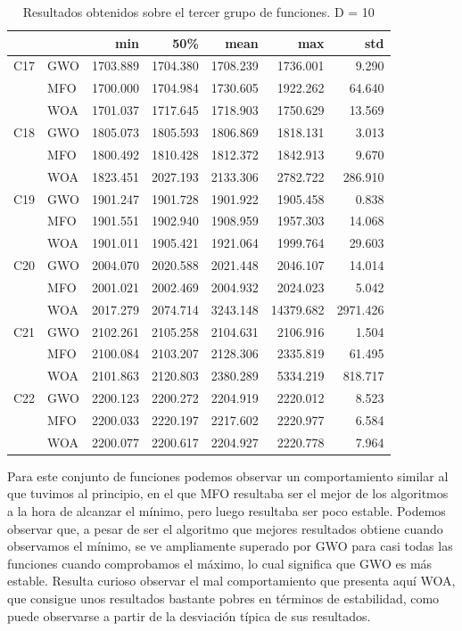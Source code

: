 \documentclass[
  a4paper,
,tablecaptionabove
]{scrartcl}
\begin{document}
\begin{longtable}{llrrrrr}
\caption{Resultados obtenidos sobre el tercer grupo de funciones. D = 10} \\
\toprule
    &     &      min &      50\% &     mean &       max &      std \\
\midrule
C17 & GWO & 1703.889 & 1704.380 & 1708.239 &  1736.001 &    9.290 \\
    & MFO & 1700.000 & 1704.984 & 1730.605 &  1922.262 &   64.640 \\
    & WOA & 1701.037 & 1717.645 & 1718.903 &  1750.629 &   13.569 \\
\midrule
C18 & GWO & 1805.073 & 1805.593 & 1806.869 &  1818.131 &    3.013 \\
    & MFO & 1800.492 & 1810.428 & 1812.372 &  1842.913 &    9.670 \\
    & WOA & 1823.451 & 2027.193 & 2133.306 &  2782.722 &  286.910 \\
\midrule
C19 & GWO & 1901.247 & 1901.728 & 1901.922 &  1905.458 &    0.838 \\
    & MFO & 1901.551 & 1902.940 & 1908.959 &  1957.303 &   14.068 \\
    & WOA & 1901.011 & 1905.421 & 1921.064 &  1999.764 &   29.603 \\
\midrule
C20 & GWO & 2004.070 & 2020.588 & 2021.448 &  2046.107 &   14.014 \\
    & MFO & 2001.021 & 2002.469 & 2004.932 &  2024.023 &    5.042 \\
    & WOA & 2017.279 & 2074.714 & 3243.148 & 14379.682 & 2971.426 \\
\midrule
C21 & GWO & 2102.261 & 2105.258 & 2104.631 &  2106.916 &    1.504 \\
    & MFO & 2100.084 & 2103.207 & 2128.306 &  2335.819 &   61.495 \\
    & WOA & 2101.863 & 2120.803 & 2380.289 &  5334.219 &  818.717 \\
\midrule
C22 & GWO & 2200.123 & 2200.272 & 2204.919 &  2220.012 &    8.523 \\
    & MFO & 2200.033 & 2220.197 & 2217.602 &  2220.977 &    6.584 \\
    & WOA & 2200.077 & 2200.617 & 2204.927 &  2220.778 &    7.964 \\
\bottomrule
\end{longtable}

Para este conjunto de funciones podemos observar un comportamiento
similar al que tuvimos al principio, en el que MFO resultaba ser el
mejor de los algoritmos a la hora de alcanzar el mínimo, pero luego
resultaba ser poco estable. Podemos observar que, a pesar de ser el
algoritmo que mejores resultados obtiene cuando observamos el mínimo, se
ve ampliamente superado por GWO para casi todas las funciones cuando
comprobamos el máximo, lo cual significa que GWO es más estable. Resulta
curioso observar el mal comportamiento que presenta aquí WOA, que
consigue unos resultados bastante pobres en términos de estabilidad,
como puede observarse a partir de la desviación típica de sus
resultados.
\end{document}
